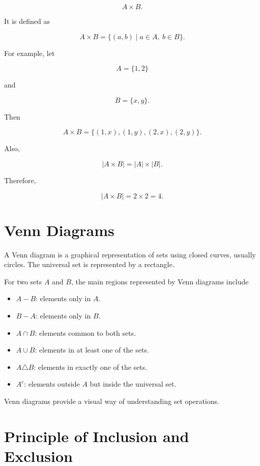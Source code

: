 \documentclass[12pt,a4paper]{article}
\begin{document}
\[
A\times B.
\]

It is defined as

\[
A\times B
=
\{(a,b)\mid a\in A,\ b\in B\}.
\]

For example, let

\[
A=\{1,2\}
\]

and

\[
B=\{x,y\}.
\]

Then

\[
A\times B
=
\{(1,x),(1,y),(2,x),(2,y)\}.
\]

Also,

\[
|A\times B|=|A|\times|B|.
\]

Therefore,

\[
|A\times B|=2\times2=4.
\]


\section{Venn Diagrams}

A Venn diagram is a graphical representation of sets using closed curves,
usually circles. The universal set is represented by a rectangle.

For two sets $A$ and $B$, the main regions represented by Venn diagrams include

\begin{itemize}
    \item $A-B$: elements only in $A$.
    \item $B-A$: elements only in $B$.
    \item $A\cap B$: elements common to both sets.
    \item $A\cup B$: elements in at least one of the sets.
    \item $A\triangle B$: elements in exactly one of the sets.
    \item $A^c$: elements outside $A$ but inside the universal set.
\end{itemize}

Venn diagrams provide a visual way of understanding set operations.


\section{Principle of Inclusion and Exclusion}
\end{document}
